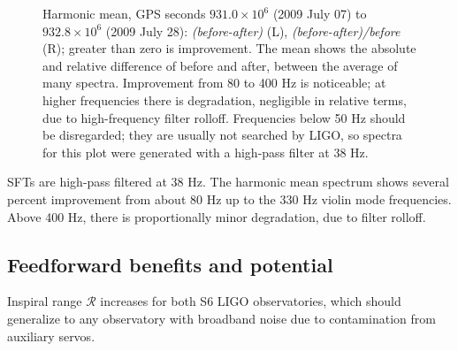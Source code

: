 \begin{figure}
\begin{center}
\caption{Harmonic mean, GPS seconds $931.0 \times 10^6$ (2009 July 07) to $932.8\times 10^6$ (2009 July 28): \textit{(before-after)} (L), \textit{(before-after)/before} (R); greater than zero is improvement. The mean shows the absolute and relative difference of before and after, between the average of many spectra. Improvement from 80 to 400 Hz is noticeable; at higher frequencies there is degradation, negligible in relative terms, due to high-frequency filter rolloff. Frequencies below 50 Hz should be disregarded; they are usually not searched by LIGO, so spectra for this plot were generated with a high-pass filter at 38 Hz.}
\label{SFTgraph}
\end{center}
\end{figure}

SFTs are high-pass filtered at 38 Hz. The harmonic mean spectrum shows several percent improvement from about 80 Hz up to the 330 Hz violin mode frequencies. Above 400 Hz, there is proportionally minor degradation,  due to filter rolloff. 

        \subsection{Feedforward benefits and potential}
        \label{benefits}

Inspiral range $\mathcal{R}$ increases for both S6 LIGO observatories, which should generalize to any observatory with broadband noise due to contamination from auxiliary servos.

